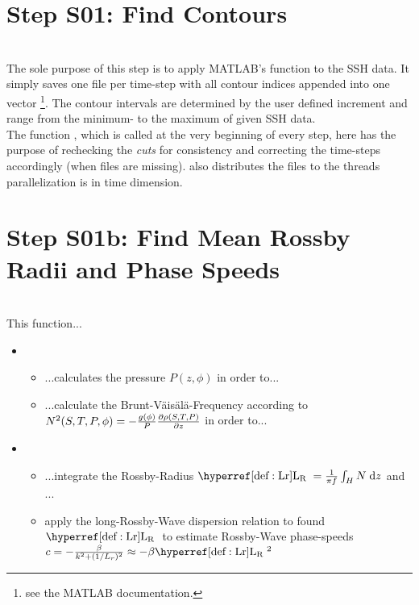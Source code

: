  \section{Step S01: Find Contours}
\\
The sole purpose of this step is to apply MATLAB's  function
to the SSH data. It simply saves one file per time-step with all contour indices
appended into one vector \footnote{see the MATLAB documentation.}. The contour
intervals are determined by the user defined increment and range from the
minimum- to the maximum of given SSH data. \\
The function , which is called at the very beginning of
every step, here has the purpose of rechecking the \textit{cuts} for
consistency and correcting the time-steps accordingly (\ie when files are
missing).  also distributes the files to the threads \ie
parallelization is in time dimension.



\section{Step S01b: Find Mean Rossby Radii and Phase Speeds}
\\

This function...
\begin{itemize}
	\item
	\begin{itemize}
		\item
		...calculates the pressure $P(z,\phi)$ in order to...
		\item
		...calculate the Brunt-V\"ais\"al\"a-Frequency according to $N^{2}(S,T,P,\phi)=-\frac{g(\phi)}{P} \frac{\partial \rho(S,T,P)}{\partial z}$
		in order to...
	\end{itemize}
	\item
	\begin{itemize}
		\item
		...integrate the Rossby-Radius $\Lr=\frac{1}{\pi f}\INT{H}{ }{N}{z}$ and ...
		\item
		apply the long-Rossby-Wave dispersion relation to found $\Lr$ to estimate Rossby-Wave phase-speeds $c=-\frac{\beta}{k^2+(1/L_r)^2} \approx -\beta \Lr^2$
	\end{itemize}
\end{itemize}

